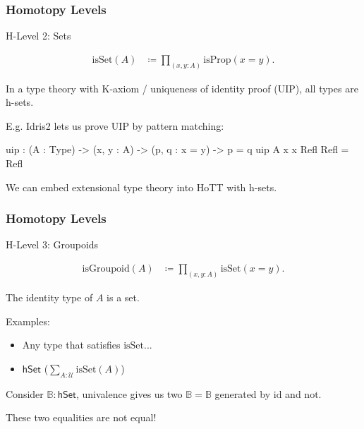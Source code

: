 \documentclass[9pt]{beamer}
\begin{document}
\begin{frame}[fragile]
\frametitle{Homotopy Levels}

H-Level 2: Sets

\begin{align*}
  \text{isSet}(A) & \coloneqq \prod_{(x,y:A)} \text{isProp}(x = y).
\end{align*}

In a type theory with K-axiom / uniqueness of identity proof (UIP), all types
are h-sets.

E.g. Idris2 lets us prove UIP by pattern matching:

\begin{code}
uip : (A : Type) -> (x, y : A) -> (p, q : x = y) -> p = q
uip A x x Refl Refl = Refl
\end{code}

We can embed extensional type theory into HoTT with h-sets.

\end{frame}


\begin{frame}
\frametitle{Homotopy Levels}

H-Level 3: Groupoids

\begin{align*}
  \text{isGroupoid}(A) & \coloneqq \prod_{(x,y:A)} \text{isSet}(x = y).
\end{align*}

The identity type of $A$ is a set.

Examples:
\begin{itemize}
  \item Any type that satisfies $\text{isSet}$...
  \item $\mathsf{hSet}$ ($\sum_{A : \mathcal{U}} \text{isSet}(A)$)
\end{itemize}

Consider $\mathbb{B} : \mathsf{hSet}$, univalence gives us two $\mathbb{B} = \mathbb{B}$
generated by $\text{id}$ and $\text{not}$.

These two equalities are not equal!

\end{frame}
\end{document}
